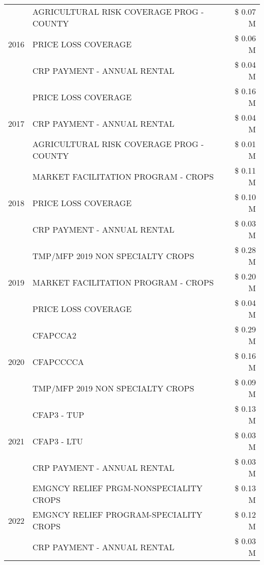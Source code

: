 \begin{tabular}{llr}
\cline{1-3}
\multirow[t]{3}{*}{2016} & AGRICULTURAL RISK COVERAGE PROG - COUNTY & \$ 0.07 M \\
 & PRICE LOSS COVERAGE & \$ 0.06 M \\
 & CRP PAYMENT - ANNUAL RENTAL & \$ 0.04 M \\
\cline{1-3}
\multirow[t]{3}{*}{2017} & PRICE LOSS COVERAGE & \$ 0.16 M \\
 & CRP PAYMENT - ANNUAL RENTAL & \$ 0.04 M \\
 & AGRICULTURAL RISK COVERAGE PROG - COUNTY & \$ 0.01 M \\
\cline{1-3}
\multirow[t]{3}{*}{2018} & MARKET FACILITATION PROGRAM - CROPS & \$ 0.11 M \\
 & PRICE LOSS COVERAGE & \$ 0.10 M \\
 & CRP PAYMENT - ANNUAL RENTAL & \$ 0.03 M \\
\cline{1-3}
\multirow[t]{3}{*}{2019} & TMP/MFP 2019 NON SPECIALTY CROPS & \$ 0.28 M \\
 & MARKET FACILITATION PROGRAM - CROPS & \$ 0.20 M \\
 & PRICE LOSS COVERAGE & \$ 0.04 M \\
\cline{1-3}
\multirow[t]{3}{*}{2020} & CFAPCCA2 & \$ 0.29 M \\
 & CFAPCCCCA & \$ 0.16 M \\
 & TMP/MFP 2019 NON SPECIALTY CROPS & \$ 0.09 M \\
\cline{1-3}
\multirow[t]{3}{*}{2021} & CFAP3 - TUP & \$ 0.13 M \\
 & CFAP3 - LTU & \$ 0.03 M \\
 & CRP PAYMENT - ANNUAL RENTAL & \$ 0.03 M \\
\cline{1-3}
\multirow[t]{3}{*}{2022} & EMGNCY RELIEF PRGM-NONSPECIALITY CROPS & \$ 0.13 M \\
 & EMGNCY RELIEF PROGRAM-SPECIALITY CROPS & \$ 0.12 M \\
 & CRP PAYMENT - ANNUAL RENTAL & \$ 0.03 M \\
\cline{1-3}
\bottomrule
\end{tabular}
